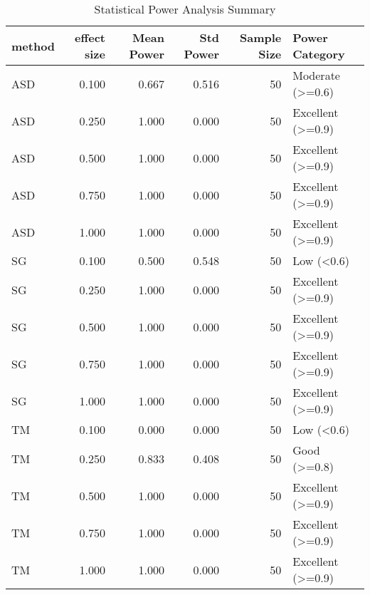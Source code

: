 \begin{table}
\caption{Statistical Power Analysis Summary}
\label{tab:power_analysis}
\begin{tabular}{lrrrrl}
\toprule
method & effect size & Mean Power & Std Power & Sample Size & Power Category \\
\midrule
ASD & 0.100 & 0.667 & 0.516 & 50 & Moderate (>=0.6) \\
ASD & 0.250 & 1.000 & 0.000 & 50 & Excellent (>=0.9) \\
ASD & 0.500 & 1.000 & 0.000 & 50 & Excellent (>=0.9) \\
ASD & 0.750 & 1.000 & 0.000 & 50 & Excellent (>=0.9) \\
ASD & 1.000 & 1.000 & 0.000 & 50 & Excellent (>=0.9) \\
SG & 0.100 & 0.500 & 0.548 & 50 & Low (<0.6) \\
SG & 0.250 & 1.000 & 0.000 & 50 & Excellent (>=0.9) \\
SG & 0.500 & 1.000 & 0.000 & 50 & Excellent (>=0.9) \\
SG & 0.750 & 1.000 & 0.000 & 50 & Excellent (>=0.9) \\
SG & 1.000 & 1.000 & 0.000 & 50 & Excellent (>=0.9) \\
TM & 0.100 & 0.000 & 0.000 & 50 & Low (<0.6) \\
TM & 0.250 & 0.833 & 0.408 & 50 & Good (>=0.8) \\
TM & 0.500 & 1.000 & 0.000 & 50 & Excellent (>=0.9) \\
TM & 0.750 & 1.000 & 0.000 & 50 & Excellent (>=0.9) \\
TM & 1.000 & 1.000 & 0.000 & 50 & Excellent (>=0.9) \\
\bottomrule
\end{tabular}
\end{table}

